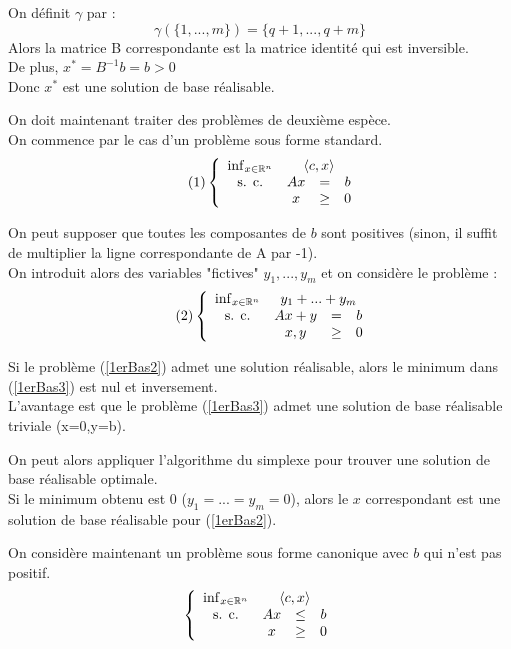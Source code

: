 \begin{dem}
	On définit $\gamma$ par :
	\[\gamma(\{1,...,m\})=\{q+1,...,q+m\}\]
	Alors la matrice B correspondante est la matrice identité qui est inversible.\\
	De plus, $x^*=B^{-1}b=b>0$ \\
	Donc $x^*$ est une solution de base réalisable.
\end{dem}

On doit maintenant traiter des problèmes de deuxième espèce.\\
On commence par le cas d'un problème sous forme standard.
\begin{equation}\tag{1} \label{1erBas2}
	\left\{ \begin{array}{c c c c} \inf_{x\in\mathbb{R}^n} & \multicolumn{3}{c}{\langle c,x\rangle} \\
						\text{s. c.}     & Ax &=& b \\
								& x &\geq& 0
	\end{array} \right.
\end{equation}

On peut supposer que toutes les composantes de $b$ sont positives (sinon, il suffit de multiplier la ligne correspondante de A par -1).\\
On introduit alors des variables "fictives" $y_1,...,y_m$ et on considère le problème :
\begin{equation}\tag{2} \label{1erBas3}
	\left\{ \begin{array}{c c c c} \inf_{x\in\mathbb{R}^n} & \multicolumn{3}{c}{y_1+...+y_m} \\
						\text{s. c.}     & Ax +y&=& b \\
								& x,y &\geq& 0
	\end{array} \right.
\end{equation}


Si le problème (\ref{1erBas2}) admet une solution réalisable, alors le minimum dans (\ref{1erBas3}) est nul et inversement.\\
L'avantage est que le problème (\ref{1erBas3}) admet une solution de base réalisable triviale (x=0,y=b).

\bigskip
On peut alors appliquer l'algorithme du simplexe pour trouver une solution de base réalisable optimale.\\
Si le minimum obtenu est 0 ($y_1=...=y_m=0$), alors le $x$ correspondant est une solution de base réalisable pour (\ref{1erBas2}). 

\bigskip
On considère maintenant un problème sous forme canonique avec $b$ qui n'est pas positif.
\[\left\{ \begin{array}{c c c c} \inf_{x\in\mathbb{R}^n} & \multicolumn{3}{c}{\langle c,x\rangle} \\
						\text{s. c.}     & Ax &\leq& b \\
								& x &\geq& 0
	\end{array} \right.\]

